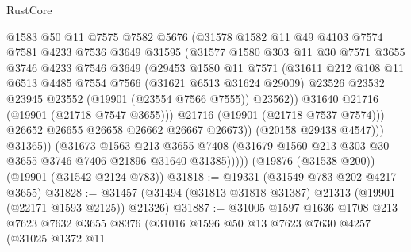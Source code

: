 \begin{lexlean}{RustCore}
\begin{coremodule}
                      @1583
                      @50
                      @11
                      @7575
                      @7582
                      @5676
                      (@31578
                        @1582
                        @11
                        @49
                        @4103
                        @7574
                        @7581
                        @4233
                        @7536
                        @3649
                        @31595
                        (@31577
                          @1580
                          @303
                          @11
                          @30
                          @7571
                          @3655
                          @3746
                          @4233
                          @7546
                          @3649
                          (@29453
                            @1580
                            @11
                            @7571
                            (@31611
                              @212
                              @108
                              @11
                              @6513
                              @4485
                              @7554
                              @7566
                              (@31621 @6513 @31624 @29009)
                              @23526
                              @23532
                              @23945
                              @23552
                              (@19901 (@23554 @7566 @7555))
                              @23562))
                          @31640
                          @21716
                          (@19901 (@21718 @7547 @3655)))
                        @21716
                        (@19901 (@21718 @7537 @7574)))
                      @26652
                      @26655
                      @26658
                      @26662
                      @26667
                      @26673))
                  (@20158 @29438 @4547)))
              @31365))
          (@31673
            @1563
            @213
            @3655
            @7408
            (@31679 @1560 @213 @303 @30 @3655 @3746 @7406 @21896 @31640 @31385)))))
    (@19876 (@31538 @200))
    (@19901 (@31542 @2124 @783))
@31818 := @19331 (@31549 @783 @202 @4217 @3655)
@31828 := @31457 (@31494 (@31813 @31818 @31387) @21313 (@19901 (@22171 @1593 @2125)) @21326)
@31887 := @31005
    @1597
    @1636
    @1708
    @213
    @7623
    @7632
    @3655
    @8376
    (@31016
      @1596
      @50
      @13
      @7623
      @7630
      @4257
      (@31025
        @1372
        @11

\end{coremodule}
\end{lexlean}
